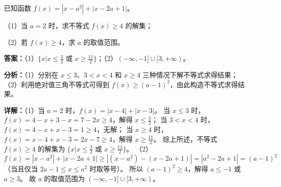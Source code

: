 \begin{question}[points=10]
[选修4—5：不等式选讲]

已知函数 $f(x)=|x-a^2|+|x-2a+1|$。

（1）当 $a=2$ 时，求不等式 $f(x)\ge4$ 的解集；

（2）若 $f(x)\ge4$，求 $a$ 的取值范围。
\begin{solution}
\textbf{答案：}（1）$\{x|x\le\frac{3}{2}\text{ 或 }x\ge\frac{11}{2}\}$；（2）$(-\infty,-1]\cup[3,+\infty)$。

\textbf{分析：}（1）分别在 $x\le3$、$3<x<4$ 和 $x\ge4$ 三种情况下解不等式求得结果；
（2）利用绝对值三角不等式可得到 $f(x)\ge(a-1)^2$，由此构造不等式求得结果。

\textbf{详解：}（1）当 $a=2$ 时，$f(x)=|x-4|+|x-3|$。
当 $x\le3$ 时，$f(x)=4-x+3-x=7-2x\ge4$，解得 $x\le\frac{3}{2}$；
当 $3<x<4$ 时，$f(x)=4-x+x-3=1\ge4$，无解；
当 $x\ge4$ 时，$f(x)=x-4+x-3=2x-7\ge4$，解得 $x\ge\frac{11}{2}$。
综上所述，不等式 $f(x)\ge4$ 的解集为 $\{x|x\le\frac{3}{2}\text{ 或 }x\ge\frac{11}{2}\}$。
（2）$f(x)=|x-a^2|+|x-2a+1|\ge|(x-a^2)-(x-2a+1)|=|a^2-2a+1|=(a-1)^2$（当且仅当 $2a-1\le x\le a^2$ 时取等号）。
所以 $(a-1)^2\ge4$，解得 $a\le-1$ 或 $a\ge3$。
故 $a$ 的取值范围为 $(-\infty,-1]\cup[3,+\infty)$。
\end{solution}
\end{question}

